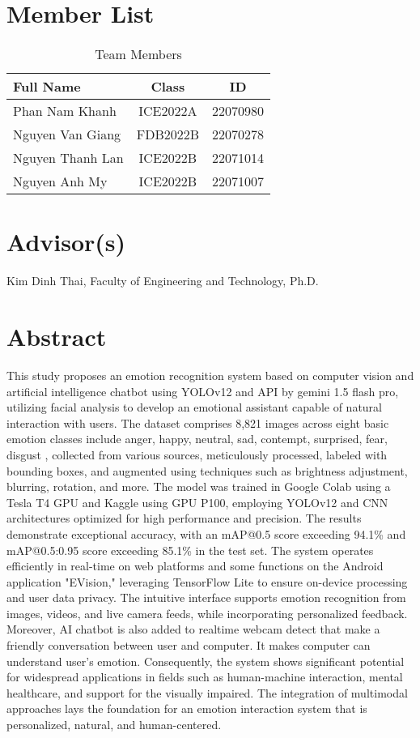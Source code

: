 \documentclass[a4paper,13pt]{report}
\begin{document}
\section{Member List}
\begin{table}[h]
  \centering
  \caption{Team Members}
  \label{tab:members}
  \begin{tabular}{lcc}
    \toprule
    Full Name & Class & ID \\
    \midrule
    Phan Nam Khanh & ICE2022A & 22070980 \\
    Nguyen Van Giang & FDB2022B & 22070278 \\
    Nguyen Thanh Lan & ICE2022B & 22071014 \\
    Nguyen Anh My & ICE2022B & 22071007 \\
    \bottomrule
  \end{tabular}
\end{table}

\section{Advisor(s)}
Kim Dinh Thai, Faculty of Engineering and Technology, Ph.D.

\section{Abstract}
This study proposes an emotion recognition system based on computer vision and artificial intelligence chatbot using YOLOv12 and API by gemini 1.5 flash pro, utilizing facial analysis to develop an emotional assistant capable of natural interaction with users. The dataset comprises 8,821 images across eight basic emotion classes include anger, happy, neutral, sad, contempt, surprised, fear, disgust , collected from various sources, meticulously processed, labeled with bounding boxes, and augmented using techniques such as brightness adjustment, blurring, rotation, and more. The model was trained in Google Colab using a Tesla T4 GPU and Kaggle using GPU P100, employing YOLOv12 and CNN architectures optimized for high performance and precision. The results demonstrate exceptional accuracy, with an mAP@0.5 score exceeding 94.1\% and mAP@0.5:0.95 score exceeding 85.1\% in the test set. The system operates efficiently in real-time on web platforms and some functions on the Android application "EVision," leveraging TensorFlow Lite to ensure on-device processing and user data privacy. The intuitive interface supports emotion recognition from images, videos, and live camera feeds, while incorporating personalized feedback. Moreover, AI chatbot is also added to realtime webcam detect that make a friendly conversation between user and computer. It makes computer can understand user's emotion.  Consequently, the system shows significant potential for widespread applications in fields such as human-machine interaction, mental healthcare, and support for the visually impaired. The integration of multimodal approaches lays the foundation for an emotion interaction system that is personalized, natural, and human-centered.
\end{document}
